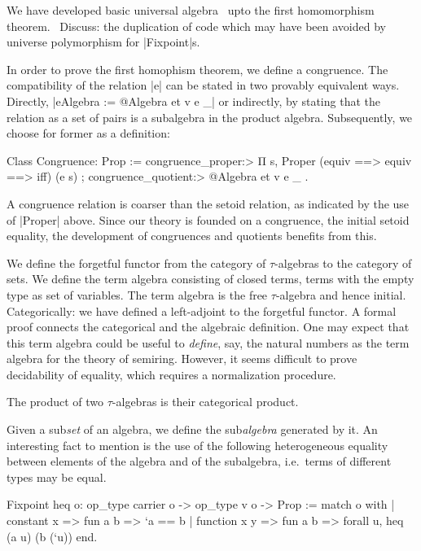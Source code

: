 \documentclass[a4paper,10pt, runningheads]{llncs}
\begin{document}
We have developed basic universal algebra~\cite{meinke1993universal} upto the first homomorphism
theorem.~
Discuss: the duplication of code which may have been avoided by universe
polymorphism for |Fixpoint|s.

In order to prove the first homophism theorem, we define a congruence.
The compatibility of the relation |e| can be stated in two provably  equivalent ways.
Directly, |eAlgebra := @Algebra et v e _| or  indirectly, by stating that the relation
as a set of pairs is a subalgebra in the product algebra.
Subsequently, we choose for former as a definition:
\begin{code}
Class Congruence: Prop :=
    { congruence_proper:> Π s, Proper (equiv ==> equiv ==> iff) (e s)
    ; congruence_quotient:> @Algebra et v e _
    }.
\end{code}
A congruence relation is coarser than the setoid relation, as indicated by the use of |Proper|
above. Since our theory is founded on a congruence, the initial setoid equality, the development of 
congruences and quotients benefits from this.

We define the forgetful functor from the category of $\tau$-algebras to the category of sets.
We define the term algebra consisting of closed terms, terms with the empty type as set of
variables. The term algebra is the free $\tau$-algebra and hence
initial. Categorically: we have defined a left-adjoint to the forgetful functor. A formal proof
connects the categorical and the algebraic definition.
One may expect that this term algebra could be useful to
\emph{define}, say, the natural numbers as the term algebra for the theory of semiring. However, it
seems difficult to prove decidability of equality, which requires a normalization procedure.

The product of two $\tau$-algebras is their categorical product.

Given a sub\emph{set} of an algebra, we define the sub\emph{algebra} generated by it.
An interesting fact to mention is the use of the following heterogeneous equality between
elements of the algebra and of the subalgebra, i.e.\ terms of different types may be equal.
\begin{code}
  Fixpoint heq {o}: op_type carrier o -> op_type v o -> Prop :=
    match o with
    | constant x => fun a b => `a == b
    | function x y => fun a b => forall u, heq (a u) (b (`u))
    end.
\end{code}
\end{document}
